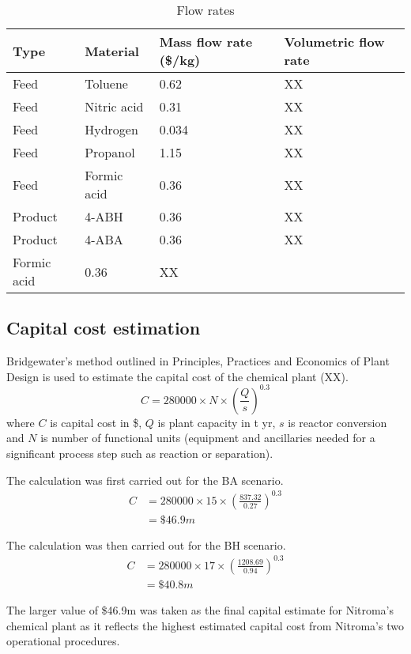 \begin{table}[h] 
\centering
\caption{Flow rates}
\label{tab:material-prices}
\begin{tabular}{llll}
    \toprule
    Type    & Material      & Mass flow rate (\$/kg) & Volumetric flow rate \\ \midrule
    Feed    & Toluene     & 0.62          & XX        \\
    Feed    & Nitric acid & 0.31          & XX        \\
    Feed    & Hydrogen    & 0.034         & XX        \\
    Feed    & Propanol    & 1.15          & XX        \\
    Feed    & Formic acid & 0.36          & XX        \\ 
    Product & 4-ABH       & 0.36          & XX        \\
    Product & 4-ABA       & 0.36          & XX        \\
    Formic acid & 0.36          & XX        \\\bottomrule
\end{tabular}
\end{table}

\subsection{Capital cost estimation}

Bridgewater's method outlined in Principles, Practices and Economics of Plant Design is used to estimate the capital cost of the chemical plant (XX).
\begin{equation}
    C= \num{280000} \times N \times \left(\frac{Q}{s}\right)^{0.3}
\end{equation}
where $C$ is capital cost in \$, $Q$ is  plant capacity in t yr, $s$ is reactor conversion and $N$ is number of functional units (equipment and ancillaries needed for a significant process step such as reaction or separation).

The calculation was first carried out for the BA scenario.
\begin{align*}
C &= \num{280000} \times 15 \times \left(\frac{837.32}{0.27}\right)^{0.3}  \\
  &= \$46.9m 
\end{align*}
 
The calculation was then carried out for the BH scenario.
\begin{align*}
C &= 280000 \times 17 \times \left(\frac{1208.69}{0.94}\right)^{0.3}  \\
  &=\$40.8m 
\end{align*}

The larger value of \$46.9m was taken as the final capital estimate for Nitroma's chemical plant as it reflects the highest estimated capital cost from Nitroma's two operational procedures.
